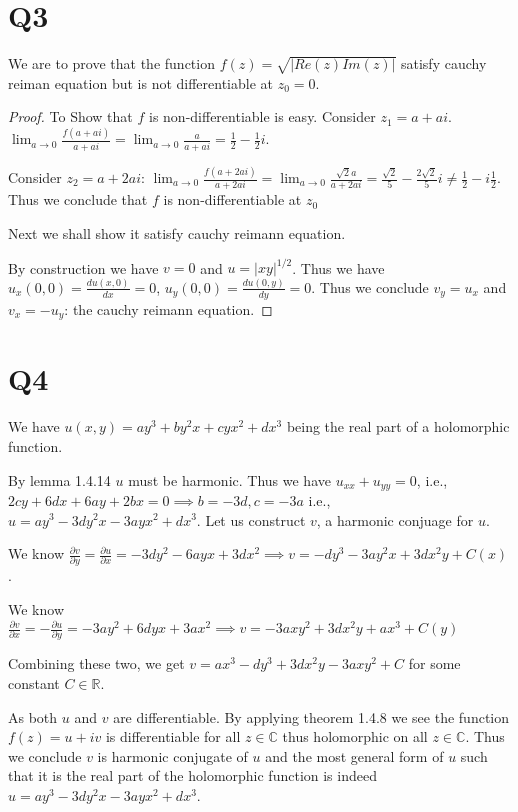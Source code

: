 \documentclass[12pt, a4paper]{article}
\theoremstyle{definition}
\theoremstyle{remark}
\newcommand{\bb}[1]{\mathbb{#1}}
\begin{document}
\section{Q3}

We are to prove that the function $f(z) = \sqrt{|Re(z)Im(z)|}$ satisfy cauchy reiman equation but is not differentiable at $z_0 = 0$.

\begin{proof}
	To Show that $f$ is non-differentiable is easy. 
	Consider $z_1 = a + ai$. 
	$\lim_{a\rightarrow 0} \frac{f(a+ai)}{a+ai} = \lim_{a \rightarrow 0}\frac{a}{a+ai} = \frac{1}{2} -\frac{1}{2}i$.

	Consider $z_2 = a + 2ai$:
	$\lim_{a\rightarrow 0} \frac{f(a+2ai)}{a+2ai} = \lim_{a \rightarrow 0}\frac{\sqrt{2}a}{a+2ai} = \frac{\sqrt{2}}{5} -\frac{2\sqrt{2}}{5}i \neq \frac{1}{2} - i \frac{1}{2}$. Thus we conclude that $f$ is non-differentiable at $z_0$

	Next we shall show it satisfy cauchy reimann equation.

	By construction we have $v = 0$ and $u = |xy|^{1/2}$. Thus we have $u_x(0,0) = \frac{du(x,0)}{dx} = 0$, $u_y(0,0) = \frac{du(0, y)}{dy}=0$. Thus we conclude $v_y = u_x$ and $v_x = - u_y$: the cauchy reimann equation.


\end{proof}

\section{Q4}
We have $u(x,y) = ay^3 + by^2x + cyx^2 + dx^3$ being the real part of a holomorphic function.

By lemma 1.4.14 $u$ must be harmonic. Thus we have $u_{xx} + u_{yy} = 0$, i.e., $2cy + 6dx + 6ay + 2bx = 0 \implies b = -3d, c = -3a $ 
i.e., $u = ay^3  -3dy^2x -3ayx^2 +dx^3$.
Let us construct $v$, a harmonic conjuage for $u$. 

We know $\frac{\partial v}{\partial y} = \frac{\partial u}{\partial x} = -3dy^2 -6ayx + 3dx^2 \implies v = -dy^3 -3ay^2x + 3dx^2y + C(x)$.

We know $\frac{\partial v}{\partial x} = -\frac{\partial u}{\partial y} = -3ay^2 +6dyx +3ax^2  \implies v = -3axy^2 + 3dx^2y + ax^3 + C(y)$

Combining these two, we get $v = ax^3 - dy^3 + 3dx^2y -3axy^2 + C$ for some constant $C \in \bb{R}$. 

As both $u$ and $v$ are differentiable. By applying theorem 1.4.8 we see the function $f(z) = u + iv$ is differentiable for all $z \in \bb{C}$ thus holomorphic on all $z \in \bb{C}$. Thus we conclude $v$ is  harmonic conjugate of $u$ and the most general form of $u$ such that it is the real part of the holomorphic function is indeed $u = ay^3  -3dy^2x -3ayx^2 +dx^3$.
\end{document}
